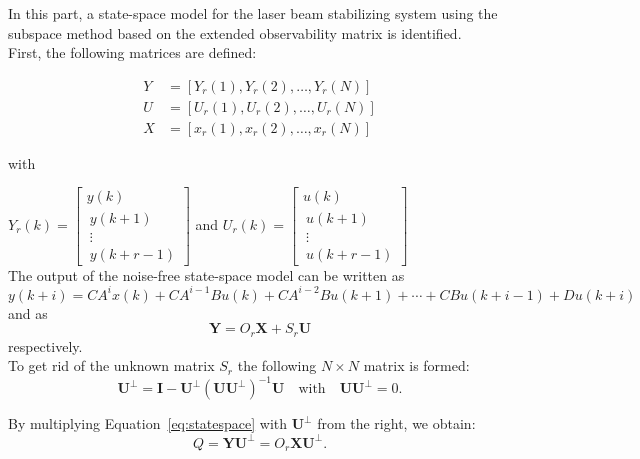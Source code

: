 \documentclass{scrartcl}
\begin{document}
In this part, a state-space model for the laser beam stabilizing system using the subspace method based on the extended observability matrix is identified. \\

First, the following matrices are defined: 

\begin{align}
 Y &= \left[Y_r(1), Y_r(2),\ldots,Y_r(N) \right] \\
 U &= \left[U_r(1), U_r(2),\ldots,U_r(N) \right] \\
 X &= \left[x_r(1), x_r(2),\ldots,x_r(N) \right]
\end{align}

with 

\quad $Y_r(k) = \left[ \begin{array}{c} y(k) \\\ y(k+1) \\\ \vdots \\\ y(k + r -1) \end{array}\right] $ \quad and \quad $U_r(k) = \left[ \begin{array}{c} u(k) \\\ u(k+1) \\\ \vdots \\\ u(k + r -1) \end{array}\right] $ \\

The output of the noise-free state-space model can be written as
\begin{equation}
y(k+i) = CA^{i}x(k) + CA^{i-1}Bu(k) + CA^{i-2}Bu(k+1) + \cdots + CBu(k+i-1) + Du(k+i)
\end{equation}
and as 
\begin{equation}
\textbf{Y} = O_r \textbf{X} + S_r \textbf{U}
\label{eq:statespace}
\end{equation}
respectively. \\

To get rid of the unknown matrix $S_r$ the following $ N \times N $ matrix is formed: 
\begin{equation}
\textbf{U}^{\bot} = \textbf{I} - \textbf{U}^{\bot}(\textbf{U}\textbf{U}^{\bot})^{-1}\textbf{U} \quad \text{with} \quad \textbf{U}\textbf{U}^{\bot} = 0.
\end{equation}

By multiplying Equation~\ref{eq:statespace} with $\textbf{U}^{\bot}$ from the right, we obtain:
\begin{equation}
Q = \textbf{Y}\textbf{U}^{\bot} = O_r\textbf{X}\textbf{U}^{\bot}.
\end{equation}
\end{document}
